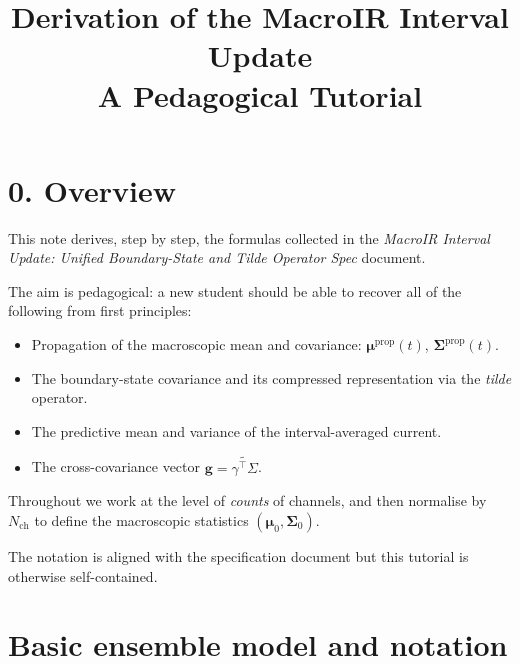 \documentclass[11pt]{article}
\title{Derivation of the MacroIR Interval Update\\[4pt]
A Pedagogical Tutorial}
\author{}
\date{}
\begin{document}
\maketitle

\newcommand{\E}{\mathbb{E}}
\newcommand{\Var}{\operatorname{Var}}
\newcommand{\Cov}{\operatorname{Cov}}
\newcommand{\diag}{\operatorname{diag}}


\section*{0. Overview}

This note derives, step by step, the formulas collected in the
\emph{MacroIR Interval Update: Unified Boundary-State and Tilde Operator Spec} document.

The aim is pedagogical: a new student should be able to recover all of the
following from first principles:

\begin{itemize}
  \item Propagation of the macroscopic mean and covariance:
    \(\boldsymbol{\mu}^{\text{prop}}(t)\), \(\boldsymbol{\Sigma}^{\text{prop}}(t)\).
  \item The boundary-state covariance and its compressed representation via the
    \emph{tilde} operator.
  \item The predictive mean and variance of the interval-averaged current.
  \item The cross-covariance vector \(\mathbf{g} = \widetilde{\gamma^\top\Sigma}\).
\end{itemize}

Throughout we work at the level of \emph{counts} of channels, and then normalise
by \(N_{\text{ch}}\) to define the macroscopic statistics
\((\boldsymbol{\mu}_0,\boldsymbol{\Sigma}_0)\).

The notation is aligned with the specification document but this tutorial is
otherwise self-contained.

\bigskip


\section{Basic ensemble model and notation}
\end{document}
